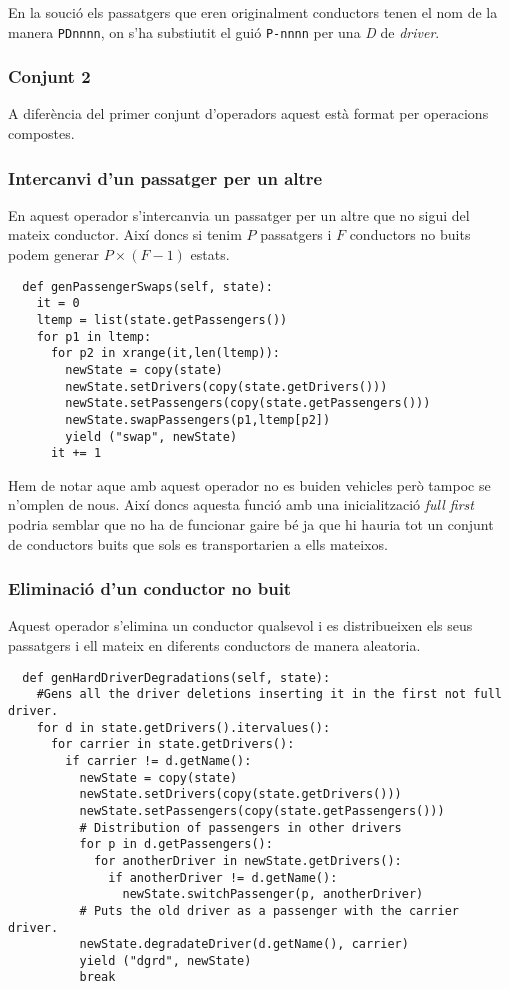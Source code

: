 En la so\lgem ució els passatgers que eren originalment conductors tenen el nom de la manera \texttt{PDnnnn},
on s'ha substiutit el guió \texttt{P-nnnn} per una \emph{D} de \emph{driver}.

\subsubsection{Conjunt 2}
A diferència del primer conjunt d'operadors aquest està format per operacions compostes.

\subsubsection{Intercanvi d'un passatger per un altre}
En aquest operador s'intercanvia un passatger per un altre que no sigui del mateix conductor.
Així doncs si tenim $P$ passatgers i $F$ conductors no buits podem generar $P \times (F-1)$ estats. 

\begin{verbatim}
  def genPassengerSwaps(self, state):
    it = 0
    ltemp = list(state.getPassengers())
    for p1 in ltemp:
      for p2 in xrange(it,len(ltemp)):
        newState = copy(state)
        newState.setDrivers(copy(state.getDrivers()))
        newState.setPassengers(copy(state.getPassengers()))
        newState.swapPassengers(p1,ltemp[p2])
        yield ("swap", newState)
      it += 1
\end{verbatim}

Hem de notar aque amb aquest operador no es buiden vehicles però tampoc se n'omplen de nous.
Així doncs aquesta funció amb una inicialització \emph{full first} podria semblar que no ha de funcionar
gaire bé ja que hi hauria tot un conjunt de conductors buits que sols es transportarien a ells mateixos.


\subsubsection{Eliminació d'un conductor no buit}
Aquest operador s'elimina un conductor qualsevol i es distribueixen els seus passatgers i ell mateix
en diferents conductors de manera aleatoria.

\begin{verbatim}
  def genHardDriverDegradations(self, state):
    #Gens all the driver deletions inserting it in the first not full driver.
    for d in state.getDrivers().itervalues():
      for carrier in state.getDrivers():
        if carrier != d.getName():
          newState = copy(state)
          newState.setDrivers(copy(state.getDrivers()))
          newState.setPassengers(copy(state.getPassengers()))
          # Distribution of passengers in other drivers
          for p in d.getPassengers():
            for anotherDriver in newState.getDrivers():
              if anotherDriver != d.getName():
                newState.switchPassenger(p, anotherDriver)
          # Puts the old driver as a passenger with the carrier driver.
          newState.degradateDriver(d.getName(), carrier)
          yield ("dgrd", newState)
          break
\end{verbatim}

